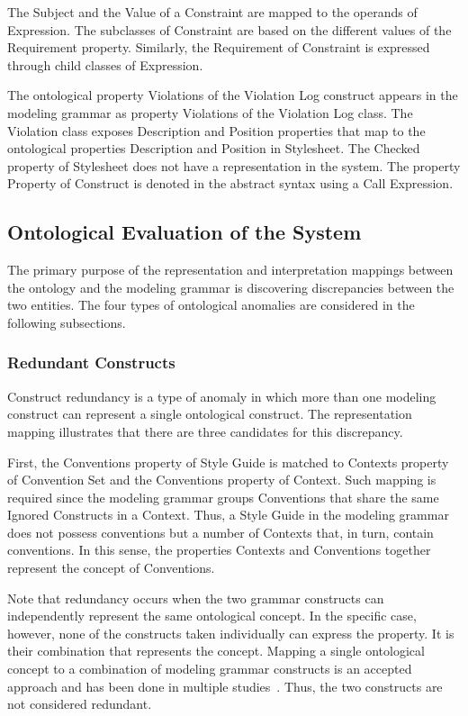 \documentclass[parskip=full]{uvamscse}
\begin{document}
The Subject and the Value of a Constraint are mapped to the operands of Expression. The subclasses
of Constraint are based on the different values of the Requirement property. Similarly, the
Requirement of Constraint is expressed through child classes of Expression.

The ontological property Violations of the Violation Log construct appears in the modeling grammar
as property Violations of the Violation Log class. The Violation class exposes Description and
Position properties that map to the ontological properties Description and Position in Stylesheet.
The Checked property of Stylesheet does not have a representation in the system. The property
Property of Construct is denoted in the abstract syntax using a Call Expression.

\subsection{Ontological Evaluation of the System}

The primary purpose of the representation and interpretation mappings between the ontology and the
modeling grammar is discovering discrepancies between the two entities. The four types of
ontological anomalies are considered in the following subsections.

\subsubsection{Redundant Constructs} 

Construct redundancy is a type of anomaly in which more than one modeling construct can represent a
single ontological construct. The representation mapping illustrates that there are three candidates
for this discrepancy. 

First, the Conventions property of Style Guide is matched to Contexts property of Convention Set and
the Conventions property of Context. Such mapping is required since the modeling grammar groups
Conventions that share the same Ignored Constructs in a Context. Thus, a Style Guide in the modeling
grammar does not possess conventions but a number of Contexts that, in turn, contain conventions. In
this sense, the properties Contexts and Conventions together represent the concept of Conventions.

Note that redundancy occurs when the two grammar constructs can independently represent the same
ontological concept. In the specific case, however, none of the constructs taken individually can
express the property. It is their combination that represents the concept. Mapping a single
ontological concept to a combination of modeling grammar constructs is an accepted approach and has
been done in multiple studies~\cite{gehlert2007toward}. Thus, the two constructs are not
considered redundant.
\end{document}
